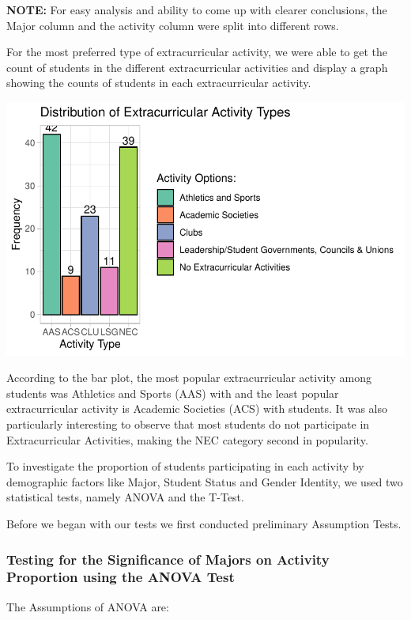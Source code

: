 \documentclass[
  letterpaper,
  DIV=11,
  numbers=noendperiod]{scrartcl}
\begin{document}
\textbf{NOTE:} For easy analysis and ability to come up with clearer
conclusions, the Major column and the activity column were split into
different rows.

For the most preferred type of extracurricular activity, we were able to
get the count of students in the different extracurricular activities
and display a graph showing the counts of students in each
extracurricular activity.

\includegraphics{technical_report_files/figure-pdf/rq1-1.pdf}

According to the bar plot, the most popular extracurricular activity
among students was Athletics and Sports (AAS) with and the least popular
extracurricular activity is Academic Societies (ACS) with students. It
was also particularly interesting to observe that most students do not
participate in Extracurricular Activities, making the NEC category
second in popularity.

To investigate the proportion of students participating in each activity
by demographic factors like Major, Student Status and Gender Identity,
we used two statistical tests, namely ANOVA and the T-Test.

Before we began with our tests we first conducted preliminary Assumption
Tests.

\subsubsection{Testing for the Significance of Majors on Activity
Proportion using the ANOVA
Test}\label{testing-for-the-significance-of-majors-on-activity-proportion-using-the-anova-test}

The Assumptions of ANOVA are:
\end{document}
